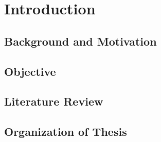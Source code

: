 \chapter{Introduction}

\section{Background and Motivation}

\section{Objective}

\section{Literature Review}

\section{Organization of Thesis}



